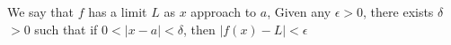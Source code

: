 \documentclass[preview]{standalone}
\begin{document}
\begin{center}
We say that $f$ has a limit $L$ as $x$ approach to $a$, Given any $\epsilon > 0$, there exists $\delta$$ > 0$ such that if $0 < |x - a| < \delta$, then $|f(x) - L| <$$\epsilon$
\end{center}
\end{document}
